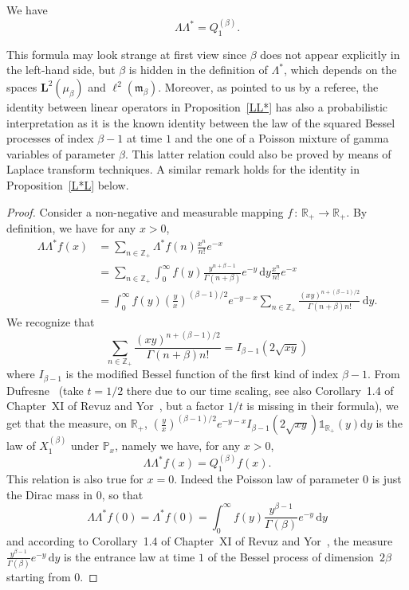 \documentclass[AHL,Unicode,longabstracts]{cedram}
\newcommand{\PP}{\mathbb{P}}
\newcommand{\RR}{\mathbb{R}}
\newcommand{\ZZ}{\mathbb{Z}}
\newcommand{\fm}{\mathfrak{m}}
\newcommand{\iy}{\infty}
\newcommand{\lt}{\left}
\newcommand{\ri}{\rightarrow}
\newcommand{\rt}{\right}
\newcommand{\st}{\,:\,}
\newcommand{\un}{\mathds{1}}
\newcommand{\Bs}{Q}
\newcommand{\esL}{\mathbf{L}}
\newcommand{\esLd}{\ell}
\newcommand{\adjL}{\Lambda^*}
\newcommand*{\dd}{\mathrm{d}}
\newcommand*{\dy}{\dd y}
\begin{document}
\begin{prop}\label{LL*}
We have
\[
\Lambda\adjL =\Bs^{(\beta)}_1.
\]
\end{prop}

This formula may look strange at first view since $\beta$ does not appear explicitly in the left-hand side, but $\beta$ is hidden in the definition of $\adjL $, which depends on the spaces $\esL^2(\mu_{\beta})$ and $\esLd^2(\fm_{\beta})$. Moreover, as pointed to us by a referee, the identity between linear operators in Proposition~\ref{LL*} has also a probabilistic interpretation as it is the known identity between the law of the squared Bessel processes of index $\beta-1$ at time $1$ and the one of a Poisson mixture of gamma variables of parameter $\beta$. This latter relation could also be proved by means of Laplace transform techniques. A similar remark holds for the identity in Proposition~\ref{L*L} below.
\begin{proof}
Consider a non-negative and measurable mapping $f\st \RR_+\ri \RR_+$. By definition, we have for any $x>0$,
\begin{align*}
\Lambda\adjL f(x)&=
\sum_{n\in\ZZ_+} \adjL f(n) \frac{x^n}{n!}e^{-x}\\
&=\sum_{n\in\ZZ_+} \int_0^{\iy}f(y)\frac{y^{n+\beta-1}}{\Gamma(n+\beta)}e^{-y}\, \dy \frac{x^n}{n!}e^{-x}
\\
&=
\int_0^{\iy}f(y)\lt(\frac{y}{x}\rt)^{(\beta-1)/2}e^{-y-x}\sum_{n\in\ZZ_+} \frac{(xy)^{n+(\beta-1)/2}}{\Gamma(n+\beta)n!}\, \dy.
\end{align*}
We recognize that
\[
\sum_{n\in\ZZ_+} \frac{(xy)^{n+(\beta-1)/2}}{\Gamma(n+\beta)n!}=I_{\beta-1}(2\sqrt{xy})
\]
where $I_{\beta-1}$ is the modified Bessel function of the first kind of index $\beta-1$. From Dufresne~\cite{MR2181585} (take $t=1/2$ there due to our time scaling, see also Corollary~1.4 of Chapter~XI of Revuz and Yor~\cite{MR1725357}, but a factor $1/t$ is missing in their formula), we get that the measure, on $\RR_+$, $
\lt(\frac{y}{x}\rt)^{(\beta-1)/2}e^{-y-x}I_{\beta-1}(2\sqrt{xy})\un_{\RR_+}(y) \dy$ is the law of $X^{(\beta)}_1$ under $\PP_x$, namely we have, for any $x>0$,
\[
\Lambda\adjL f(x)=\Bs^{(\beta)}_1 f (x).
\]
This relation is also true for $x=0$. Indeed the Poisson law of parameter 0 is just the Dirac mass in 0, so that
\[
\Lambda\adjL f(0)= \adjL f(0)=\int_0^{\iy}f(y)\frac{y^{\beta-1}}{\Gamma(\beta)}e^{-y}\, \dy
\]
and according to Corollary~1.4 of Chapter~XI of Revuz and Yor~\cite{MR1725357}, the measure $\frac{y^{\beta-1}}{\Gamma(\beta)}e^{-y}\, \dy$ is the entrance law at time $1$ of the Bessel process of dimension~$2\beta$ starting from $0$.
\end{proof}
\end{document}
